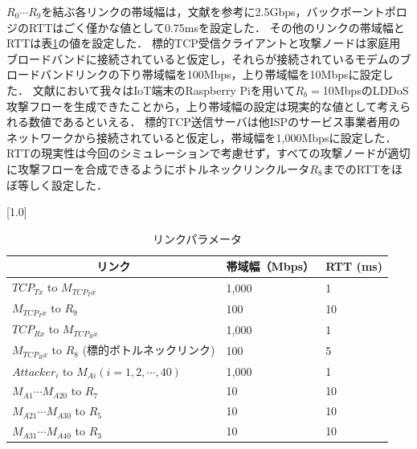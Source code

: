 \documentclass[Japanese]{dicomopapers}
\begin{document}
$R_{0} \cdots R_{9}$を結ぶ各リンクの帯域幅は，文献\cite{internet-backbone}を参考に2.5Gbps，バックボーントポロジのRTTはごく僅かな値として0.75msを設定した．
その他のリンクの帯域幅とRTTは表\ref{tab:link-param}の値を設定した．
標的TCP受信クライアントと攻撃ノードは家庭用ブロードバンドに接続されていると仮定し，それらが接続されているモデムのブロードバンドリンクの下り帯域幅を100Mbps，上り帯域幅を10Mbpsに設定した．
文献\cite{mine-wip-paper}において我々はIoT端末のRaspberry Piを用いて$R_{b}=$10MbpsのLDDoS攻撃フローを生成できたことから，上り帯域幅の設定は現実的な値として考えられる数値であるといえる．
標的TCP送信サーバは他ISPのサービス事業者用のネットワークから接続されていると仮定し，帯域幅を1,000Mbpsに設定した．
RTTの現実性は今回のシミュレーションで考慮せず，すべての攻撃ノードが適切に攻撃フローを合成できるようにボトルネックリンクルータ$R_{8}$までのRTTをほぼ等しく設定した．

\begin{table}[tb]
    \caption{リンクパラメータ}
    \label{tab:link-param}
    \begin{center}
        \scalebox{0.80}[1.0]{
            \begin{tabular}{lll}
                \hline
                \multicolumn{1}{c}{リンク}                           & \multicolumn{1}{c}{帯域幅（Mbps）} & \multicolumn{1}{c}{RTT (ms)} \\ \hline
                $TCP_{Tx}$ to $M_{TCP_Tx}$                        & 1,000                         & 1                            \\
                $M_{TCP_Tx}$ to $R_{9}$                           & 100                           & 10                           \\
                $TCP_{Rx}$ to $M_{TCP_Rx}$                        & 1,000                         & 1                            \\
                $M_{TCP_Rx}$ to $R_{8}$ (標的ボトルネックリンク)             & 100                           & 5                            \\
                $Attacker_{i}$ to $M_{Ai} (i = 1, 2, \cdots, 40)$ & 1,000                         & 1                            \\
                $M_{A1} \cdots M_{A20}$ to $R_{7}$                & 10                            & 10                           \\
                $M_{A21} \cdots M_{A30}$ to $R_{5}$               & 10                            & 10                           \\
                $M_{A31} \cdots M_{A40}$ to $R_{3}$               & 10                            & 10                           \\ \hline
            \end{tabular}
        }
    \end{center}
\end{table}
\end{document}
